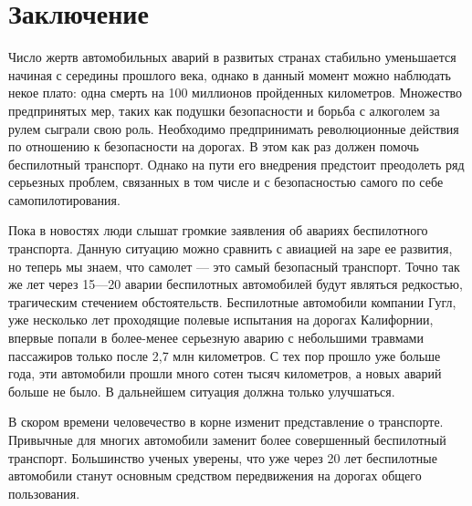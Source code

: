\chapter*{Заключение}						%

Число жертв автомобильных аварий в развитых странах стабильно уменьшается 
начиная с середины прошлого века, однако в данный момент можно наблюдать
некое плато: одна смерть на 100 
миллионов пройденных километров. Множество предпринятых мер, таких как подушки
безопасности и борьба с алкоголем за рулем сыграли свою роль. Необходимо 
предпринимать революционные действия по отношению к безопасности на дорогах.
В этом как раз должен помочь беспилотный транспорт. Однако на пути его 
внедрения предстоит преодолеть ряд серьезных проблем, связанных в том числе и
с безопасностью самого по себе самопилотирования.

Пока в новостях люди слышат громкие заявления об авариях беспилотного транспорта.
Данную ситуацию можно сравнить с авиацией на заре 
ее развития, но теперь мы знаем, что самолет — это самый безопасный транспорт. 
Точно так же лет через 15—20 аварии беспилотных автомобилей будут являться
редкостью, трагическим стечением обстоятельств.
Беспилотные автомобили компании Гугл, уже 
несколько лет проходящие полевые испытания на дорогах Калифорнии, впервые попали 
в более-менее серьезную аварию с небольшими травмами пассажиров только после 2,7 
млн километров. С тех пор прошло уже больше года, эти автомобили прошли 
много сотен тысяч километров, а новых аварий больше не было. В дальнейшем
ситуация должна только улучшаться.

В скором времени человечество в корне изменит представление о транспорте.
Привычные для многих автомобили заменит более совершенный беспилотный транспорт. 
Большинство ученых уверены, что уже через 20 лет беспилотные автомобили
станут основным средством передвижения на дорогах общего пользования.

